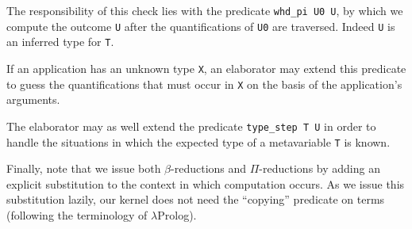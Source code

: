 The responsibility of this check lies with the predicate \verb+whd_pi U0 U+,
by which we compute the outcome \verb+U+ after the quantifications of
\verb+U0+ are traversed. Indeed \verb+U+ is an inferred type for \verb+T+.

If an application has an unknown type \verb+X+,
an elaborator may extend this predicate to guess the quantifications
that must occur in \verb+X+ on the basis of the application's arguments.

The elaborator may as well extend the predicate \verb+type_step T U+
in order to handle the situations in which
the expected type of a metavariable \verb+T+ is known.

Finally, note that we issue both $\beta$-reductions and $\Pi$-reductions
by adding an explicit substitution to the context in which computation occurs.
As we issue this substitution lazily,
our kernel does not need the ``copying'' predicate on terms
(following the terminology of $\lambda$Prolog).
